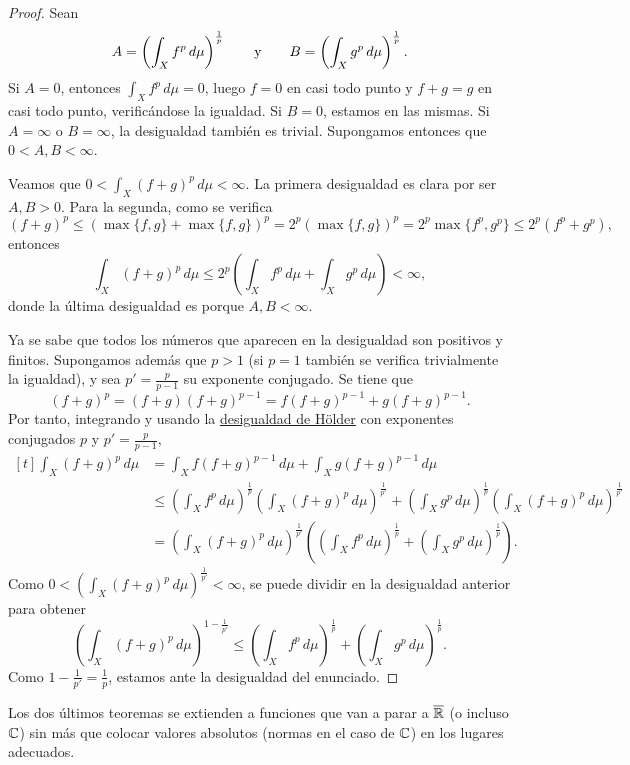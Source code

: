 \documentclass[a4paper, 11pt, oneside]{report}
\begin{document}
\begin{proof}
  Sean
  \[A = \left(\int_X f^p \, d\mu\right)^{\frac{1}{p}} \qquad \textup{y} \qquad B = \left(\int_X g^{p} \, d\mu\right)^{\frac{1}{p}}.\]
  Si $A = 0$, entonces $\int_X f^p \, d\mu = 0$, luego $f = 0$ en casi todo punto y $f+g = g$ en casi todo punto, verificándose la igualdad. Si $B = 0$, estamos en las mismas. Si $A = \infty$ o $B = \infty$, la desigualdad también es trivial. Supongamos entonces que $0 < A,B< \infty$. 

  Veamos que $0 < \int_X(f+g)^p \, d\mu < \infty$. La primera desigualdad es clara por ser $A,B>0$. Para la segunda, como se verifica
  \[(f+g)^p \leq (\max\{f,g\}+\max\{f,g\})^p = 2^p(\max\{f,g\})^p = 2^p\max\{f^p,g^p\} \leq 2^p(f^p+g^p),\]
  entonces
  \[\int_X(f+g)^p \, d\mu \leq 2^p \left(\int_Xf^p \, d\mu + \int_Xg^p \, d\mu\right)< \infty,\]
  donde la última desigualdad es porque $A,B<\infty$.

  Ya se sabe que todos los números que aparecen en la desigualdad son positivos y finitos. Supongamos además que $p > 1$ (si $p=1$ también se verifica trivialmente la igualdad), y sea $p' = \frac{p}{p-1}$ su exponente conjugado. Se tiene que
  \[(f+g)^p = (f+g)(f+g)^{p-1} = f(f+g)^{p-1}+g(f+g)^{p-1}.\]
  Por tanto, integrando y usando la \hyperref[teo:1.2.6]{\color{c1}desigualdad de Hölder} con exponentes conjugados $p$ y $p'=\frac{p}{p-1}$,
  \[\begin{aligned}[t]
    \int_X(f+g)^p \, d\mu &= \int_Xf(f+g)^{p-1} \, d\mu + \int_Xg(f+g)^{p-1}\, d\mu \\
    &\leq \left(\int_Xf^p \, d\mu\right)^{\frac{1}{p}}\left(\int_X(f+g)^p \, d\mu\right)^{\frac{1}{p'}}+\left(\int_Xg^p \, d\mu\right)^{\frac{1}{p}}\left(\int_X(f+g)^p \, d\mu\right)^{\frac{1}{p'}} \\
    &= \left(\int_X(f+g)^p \, d\mu\right)^{\frac{1}{p'}}\left(\left(\int_Xf^p \, d\mu\right)^{\frac{1}{p}}+\left(\int_Xg^p \, d\mu\right)^{\frac{1}{p}}\right).
  \end{aligned}
  \]
  Como $0 < \left(\int_X(f+g)^p \, d\mu\right)^{\frac{1}{p'}} < \infty$, se puede dividir en la desigualdad anterior para obtener
  \[\left(\int_X(f+g)^p \, d\mu\right)^{1-\frac{1}{p'}} \leq \left(\int_Xf^p \, d\mu\right)^{\frac{1}{p}}+\left(\int_Xg^p \, d\mu\right)^{\frac{1}{p}}.\]
  Como $1-\frac{1}{p'} = \frac{1}{p}$, estamos ante la desigualdad del enunciado.
\end{proof}

Los dos últimos teoremas se extienden a funciones que van a parar a $\overline{\mathbb R}$ (o incluso $\mathbb C$) sin más que colocar valores absolutos (normas en el caso de $\mathbb C$) en los lugares adecuados.
\end{document}
